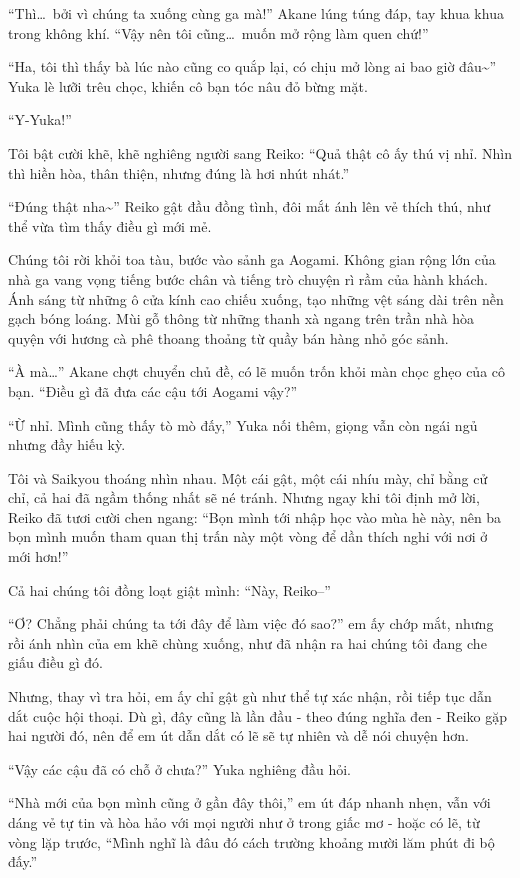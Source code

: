 \documentclass[../main.tex]{subfiles}
\begin{document}
``Thì\dots\ bởi vì chúng ta xuống cùng ga mà!'' Akane lúng túng đáp, tay khua khua trong không khí. ``Vậy nên tôi cũng\dots\ muốn mở rộng làm quen chứ!''

``Ha, tôi thì thấy bà lúc nào cũng co quắp lại, có chịu mở lòng ai bao giờ đâu\~{}'' Yuka lè lưỡi trêu chọc, khiến cô bạn tóc nâu đỏ bừng mặt.

``Y-Yuka!''

Tôi bật cười khẽ, khẽ nghiêng người sang Reiko: ``Quả thật cô ấy thú vị nhỉ. Nhìn thì hiền hòa, thân thiện, nhưng đúng là hơi nhút nhát.''

``Đúng thật nha\~{}'' Reiko gật đầu đồng tình, đôi mắt ánh lên vẻ thích thú, như thể vừa tìm thấy điều gì mới mẻ.

Chúng tôi rời khỏi toa tàu, bước vào sảnh ga Aogami. Không gian rộng lớn của nhà ga vang vọng tiếng bước chân và tiếng trò chuyện rì rầm của hành khách. Ánh sáng từ những ô cửa kính cao chiếu xuống, tạo những vệt sáng dài trên nền gạch bóng loáng. Mùi gỗ thông từ những thanh xà ngang trên trần nhà hòa quyện với hương cà phê thoang thoảng từ quầy bán hàng nhỏ góc sảnh.

``À mà\dots'' Akane chợt chuyển chủ đề, có lẽ muốn trốn khỏi màn chọc ghẹo của cô bạn. ``Điều gì đã đưa các cậu tới Aogami vậy?''

``Ừ nhỉ. Mình cũng thấy tò mò đấy,'' Yuka nối thêm, giọng vẫn còn ngái ngủ nhưng đầy hiếu kỳ.


Tôi và Saikyou thoáng nhìn nhau. Một cái gật, một cái nhíu mày, chỉ bằng cử chỉ, cả hai đã ngầm thống nhất sẽ né tránh. Nhưng ngay khi tôi định mở lời, Reiko đã tươi cười chen ngang: ``Bọn mình tới nhập học vào mùa hè này, nên ba bọn mình muốn tham quan thị trấn này một vòng để dần thích nghi với nơi ở mới hơn!''

Cả hai chúng tôi đồng loạt giật mình: ``Này, Reiko--''

``Ơ? Chẳng phải chúng ta tới đây để làm việc đó sao?'' em ấy chớp mắt, nhưng rồi ánh nhìn của em khẽ chùng xuống, như đã nhận ra hai chúng tôi đang che giấu điều gì đó.

Nhưng, thay vì tra hỏi, em ấy chỉ gật gù như thể tự xác nhận, rồi tiếp tục dẫn dắt cuộc hội thoại. Dù gì, đây cũng là lần đầu - theo đúng nghĩa đen - Reiko gặp hai người đó, nên để em út dẫn dắt có lẽ sẽ tự nhiên và dễ nói chuyện hơn.

``Vậy các cậu đã có chỗ ở chưa?'' Yuka nghiêng đầu hỏi.

``Nhà mới của bọn mình cũng ở gần đây thôi,'' em út đáp nhanh nhẹn, vẫn với dáng vẻ tự tin và hòa hảo với mọi người như ở trong giấc mơ - hoặc có lẽ, từ vòng lặp trước, ``Mình nghĩ là đâu đó cách trường khoảng mười lăm phút đi bộ đấy.''
\end{document}
